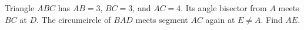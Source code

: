 Triangle $ABC$ has $AB=3$, $BC=3$, and $AC=4$. Its angle bisector from $A$ meets $BC$ at $D$. The circumcircle of $BAD$ meets segment $AC$ again at $E\ne A$. Find $AE$.
